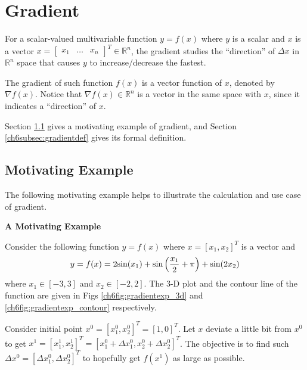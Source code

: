 \section{Gradient} \label{ch6sec:gradient}

For a scalar-valued multivariable function $y=f(x)$ where $y$ is a scalar and $x$ is a vector $x = \left[\begin{array}{ccc}
                                                                               x_1 & \ldots & x_n
                                                                             \end{array}\right]^T \in \mathbb{R}^n$, the gradient studies the ``direction'' of $\Delta x$ in $\mathbb{R}^n$ space that causes $y$ to increase/decrease the fastest.

The gradient of such function $f(x)$ is a vector function of $x$, denoted by $\nabla f(x)$. Notice that $\nabla f(x) \in \mathbb{R}^n$ is a vector in the same space with $x$, since it indicates a ``direction'' of $x$.

Section \ref{ch6subsec:gradientmotivatingexp} gives a motivating example of gradient, and Section \ref{ch6subsec:gradientdef} gives its formal definition.

\subsection{Motivating Example} \label{ch6subsec:gradientmotivatingexp}

The following motivating example helps to illustrate the calculation and use case of gradient.

\begin{mdframed}
\noindent \textbf{A Motivating Example}

Consider the following function $y=f(x)$ where $x = [x_1,x_2]^T$ is a vector and
\begin{eqnarray}
    y = f(x) = 2\textup{sin}(x_1) + \textup{sin}\left(\dfrac{x_1}{2} + \pi\right) + \textup{sin}(2x_2) \label{ch6eq:gradientexp_hill}
\end{eqnarray}
where $x_1\in[-3,3]$ and $x_2\in[-2,2]$. The 3-D plot and the contour line of the function are given in Figs \ref{ch6fig:gradientexp_3d} and \ref{ch6fig:gradientexp_contour} respectively.

Consider initial point $x^0 = [x_1^0, x_2^0]^T = [1,0]^T$. Let $x$ deviate a little bit from $x^0$ to get $x^1 = [x_1^1, x_2^1]^T = [x_1^0 + \Delta x_1^0, x_2^0 + \Delta x_2^0]^T$. The objective is to find such $\Delta x^0 = [\Delta x_1^0, \Delta x_2^0]^T$ to hopefully get $f(x^1)$ as large as possible.

\end{mdframed}

